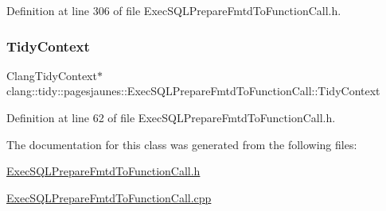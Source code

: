 Definition at line 306 of file Exec\+S\+Q\+L\+Prepare\+Fmtd\+To\+Function\+Call.\+h.

\mbox{\label{classclang_1_1tidy_1_1pagesjaunes_1_1_exec_s_q_l_prepare_fmtd_to_function_call_a6805b036cc8249bf324332bed7aa8d30}} 
\subsubsection{\texorpdfstring{Tidy\+Context}{TidyContext}}
{\footnotesize\ttfamily Clang\+Tidy\+Context$\ast$ clang\+::tidy\+::pagesjaunes\+::\+Exec\+S\+Q\+L\+Prepare\+Fmtd\+To\+Function\+Call\+::\+Tidy\+Context}



Definition at line 62 of file Exec\+S\+Q\+L\+Prepare\+Fmtd\+To\+Function\+Call.\+h.



The documentation for this class was generated from the following files\+:\begin{DoxyCompactItemize}
\item 
\hyperlink{_exec_s_q_l_prepare_fmtd_to_function_call_8h}{Exec\+S\+Q\+L\+Prepare\+Fmtd\+To\+Function\+Call.\+h}\item 
\hyperlink{_exec_s_q_l_prepare_fmtd_to_function_call_8cpp}{Exec\+S\+Q\+L\+Prepare\+Fmtd\+To\+Function\+Call.\+cpp}\end{DoxyCompactItemize}
